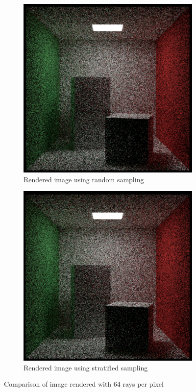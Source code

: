 \documentclass[12pt]{article}
\begin{document}
\begin{figure}[H]
    \centering
    \begin{subfigure}[b]{0.45\textwidth}
        \centering
        \includegraphics[width=\textwidth]{images/strat_vs_non/1sam64tim.png}
        \caption{Rendered image using random sampling}
        \label{fig:randomsamplesno_strat}
    \end{subfigure}
    \hfill
    \begin{subfigure}[b]{0.45\textwidth}
        \centering
        \includegraphics[width=\textwidth]{images/strat_vs_non/64sam1tim.png}
        \caption{Rendered image using stratified sampling}
        \label{fig:stratified_sampling}
    \end{subfigure}
    \caption{Comparison of image rendered with 64 rays per pixel}
    \label{fig:strat_comparison}
\end{figure}
\end{document}
